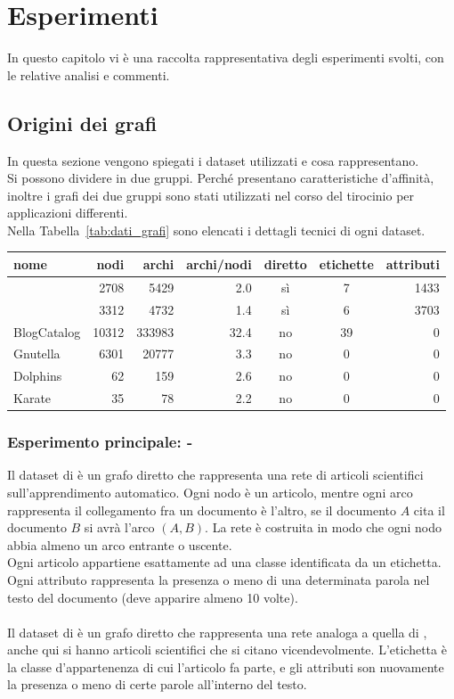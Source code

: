 %
%
\chapter{Esperimenti}
In questo capitolo vi è una raccolta rappresentativa degli esperimenti svolti, con le relative analisi e commenti.
\section{Origini dei grafi}
In questa sezione vengono spiegati i dataset utilizzati e cosa rappresentano.\\
Si possono dividere in due gruppi. Perché presentano caratteristiche d'affinità, inoltre i grafi dei due gruppi sono stati utilizzati nel corso del tirocinio per applicazioni differenti.\\
Nella Tabella~\ref{tab:dati_grafi} sono elencati i dettagli tecnici di ogni dataset.
%
\begin{center}
	\begin{tabular}{|l|r|r|r|c|c|r|}
		\hline
		nome&nodi&archi&archi/nodi&diretto&etichette&attributi\\
		\hline
		\cora & 2708 & 5429 & 2.0 & sì & 7 & 1433\\
		\citeseer & 3312 & 4732 & 1.4 & sì & 6 & 3703\\
		\hline
		BlogCatalog & 10312 & 333983 & 32.4 & no & 39 & 0\\
		Gnutella & 6301 & 20777 & 3.3 & no & 0 & 0\\
		Dolphins & 62 & 159 & 2.6 & no & 0 & 0\\
		Karate & 35 & 78 & 2.2 & no & 0 & 0\\
		\hline
		\end{tabular}
		\label{tab:dati_grafi}
\end{center}
%
\subsection*{Esperimento principale: \cora - \citeseer}\cite{Co-Ci_1}\cite{Co-Ci_2}
Il dataset di \textbf{\cora} è un grafo diretto che rappresenta una rete di articoli scientifici sull'apprendimento automatico. Ogni nodo è un articolo, mentre ogni arco rappresenta il collegamento fra un documento è l'altro, se il documento $A$ cita il documento $B$ si avrà l'arco $(A, B)$. La rete è costruita in modo che ogni nodo abbia almeno un arco entrante o uscente.\\
Ogni articolo appartiene esattamente ad una classe identificata da un etichetta. Ogni attributo rappresenta la presenza o meno di una determinata parola nel testo del documento (deve apparire almeno 10 volte).\\
\\
Il dataset di \textbf{\citeseer} è un grafo diretto che rappresenta una rete analoga a quella di \cora, anche qui si hanno articoli scientifici che si citano vicendevolmente. L'etichetta è la classe d'appartenenza di cui l'articolo fa parte, e gli attributi son nuovamente la presenza o meno di certe parole all'interno del testo.\\
%
